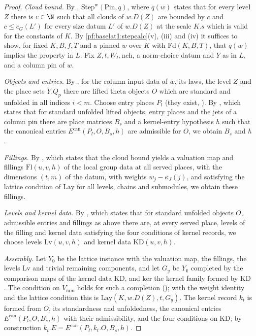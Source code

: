 \begin{proof}
\emph{Cloud bound.} By ,
$\mathrm{Step}^{\mathrm w}(\mathrm{Pin},q)$, where $q(w)$ states that for every level $Z$ there is $c\in\N$ such that all
clouds of $w.D(Z)$ are bounded by $c$ and $c\le c_G(L')$ for every size datum $L'$ of $w.D(Z)$ at the scale $K.s$ which is
valid for the constants of $K$. By \cref{pf:baselat1:stepcalc}(v), (iii) and (iv) it suffices to show, for fixed
$K,B,f,T$ and a pinned $w$ over $K$ with $\mathrm{Fd}(K,B,T)$, that $q(w)$ implies the property in $L$. Fix
$Z,t,W_t,\mathrm{nch}$, a norm-choice datum and $Y$ as in $L$, and a column pin of $w$.

\emph{Objects and entries.} By , for the column input data of $w$,
its laws, the level $Z$ and the place sets $Y.Q_p$ there are lifted theta objects $O$ which are standard and
unfolded in all indices $i<m$. Choose entry places $P_l$ (they exist,
). By
, which states that for standard unfolded lifted
objects, entry places and the jets of a column pin there are place matrices $B_s$ and a kernel-entry hypothesis $h$
such that the canonical entries $E^{\mathrm{can}}(P_l,O,B_s,h)$ are admissible for $O$, we obtain $B_s$ and $h$.

\emph{Fillings.} By , which states that the cloud bound
yields a valuation map and fillings $\mathrm{Fl}(u,v,h)$ of the local group data at all served places, with the
dimensions $(t,m)$ of the datum, with weights $w_j-\kappa_J(j)$, and satisfying the lattice condition of
$\mathrm{Lay}$ for all levels, chains and submodules, we obtain these fillings.

\emph{Levels and kernel data.} By , which states that for
standard unfolded objects $O$, admissible entries and fillings as above there are, at every served place, levels of
the filling and kernel data satisfying the four conditions of kernel records, we choose levels $\mathrm{Lv}(u,v,h)$ and
kernel data $\mathrm{KD}(u,v,h)$.

\emph{Assembly.} Let $Y_0$ be the lattice instance with the valuation map, the fillings, the levels $\mathrm{Lv}$ and
trivial remaining components, and let $G_y$ be $Y_0$ completed by the comparison maps of the kernel data $\mathrm{KD}$,
and $\mathrm{ker}$ the kernel family formed by $\mathrm{KD}$. The condition on $V_{\mathrm{ram}}$ holds for such a
completion (); with the weight identity and the lattice condition this
is $\mathrm{Lay}(K,w.D(Z),t,G_y)$. The kernel record $k_t$ is formed from $O$, its standardness and unfoldedness, the
canonical entries $E^{\mathrm{can}}(P_l,O,B_s,h)$ with their admissibility, and the four conditions on
$\mathrm{KD}$; by construction $k_t.E=E^{\mathrm{can}}(P_l,k_t.O,B_s,h)$.
\end{proof}

